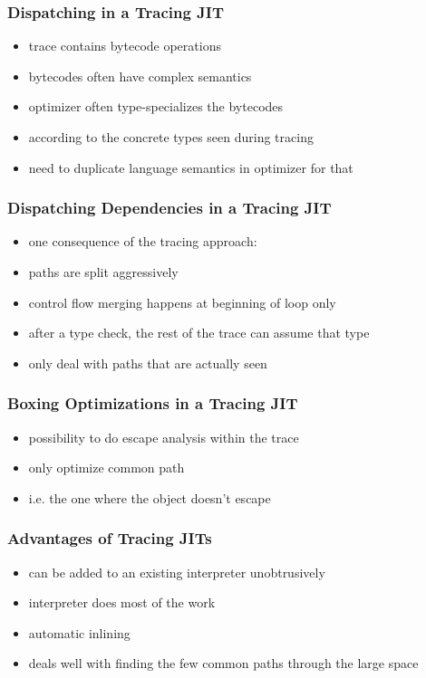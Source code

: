 \documentclass[utf8x]{beamer}
\begin{document}

\begin{frame}
  \frametitle{Dispatching in a Tracing JIT}
  \begin{itemize}
      \item trace contains bytecode operations
      \item bytecodes often have complex semantics
      \item optimizer often type-specializes the bytecodes
      \item according to the concrete types seen during tracing
      \item need to duplicate language semantics in optimizer for that
  \end{itemize}
\end{frame}


\begin{frame}
  \frametitle{Dispatching Dependencies in a Tracing JIT}
  \begin{itemize}
      \item one consequence of the tracing approach:
      \item paths are split aggressively
      \item control flow merging happens at beginning of loop only
      \item after a type check, the rest of the trace can assume that type
      \item only deal with paths that are actually seen
  \end{itemize}
\end{frame}

\begin{frame}
  \frametitle{Boxing Optimizations in a Tracing JIT}
  \begin{itemize}
      \item possibility to do escape analysis within the trace
      \item only optimize common path
      \item i.e. the one where the object doesn't escape
  \end{itemize}
\end{frame}


\begin{frame}
    \frametitle{Advantages of Tracing JITs}
    \begin{itemize}
    \item can be added to an existing interpreter unobtrusively
    \item interpreter does most of the work
    \item automatic inlining
    \item deals well with finding the few common paths through the large space
    \end{itemize}
\end{frame}
\end{document}
